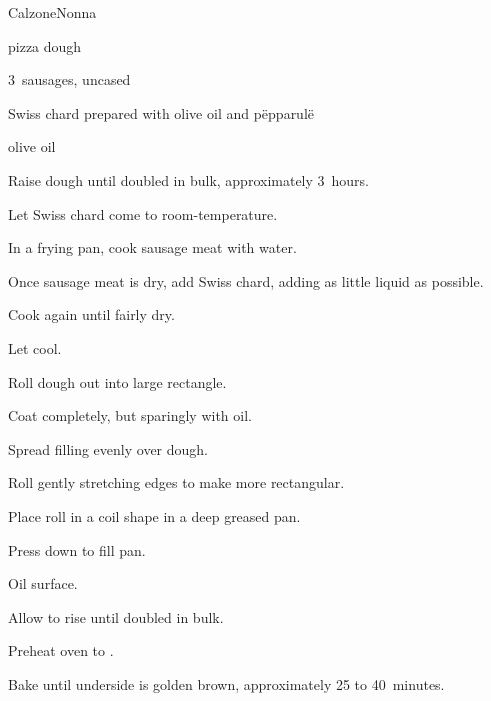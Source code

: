 \begin{recipe}{Calzone}{Nonna}{}

\begin{ingredients}
\item pizza dough
\item 3~sausages, uncased
\item Swiss chard prepared with olive oil and p\"epparul\"e
\item olive oil
\end{ingredients}

\begin{directions}
\item Raise dough until doubled in bulk, approximately 3~hours.
\item Let Swiss chard come to room-temperature.
\item In a frying pan, cook sausage meat with \C{\quarter} water.
\item Once sausage meat is dry, add Swiss chard, adding as little liquid as possible.
\item Cook again until fairly dry.
\item Let cool.
\item Roll dough out into large rectangle.
\item Coat completely, but sparingly with oil.
\item Spread filling evenly over dough.
\item Roll gently stretching edges to make more rectangular.
\item Place roll in a coil shape in a deep greased pan.
\item Press down to fill pan.
\item Oil surface.
\item Allow to rise until doubled in bulk.
\item Preheat oven to .
\item Bake until underside is golden brown, approximately 25 to 40~minutes.
\end{directions}

\end{recipe}
